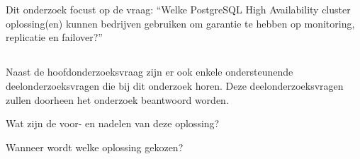 
\section{}
\label{sec:onderzoeksvraag}

\subsection{}
\label{subsec:Hoofdonderzoeksvraag}

Dit onderzoek focust op de vraag: “Welke PostgreSQL High Availability cluster oplossing(en) kunnen bedrijven gebruiken om garantie te hebben op monitoring, replicatie en failover?”

\subsection{}
\label{subsec:Deelonderzoeksvraag}

Naast de hoofdonderzoeksvraag zijn er ook enkele ondersteunende deelonderzoeksvragen die bij dit onderzoek horen. Deze deelonderzoeksvragen zullen doorheen het onderzoek beantwoord worden. %

 \begin{description}
    \item
    \item[$\cdot$] Wat zijn de voor- en nadelen van deze oplossing?
    \item[$\cdot$] Wanneer wordt welke oplossing gekozen?
\end{description}


